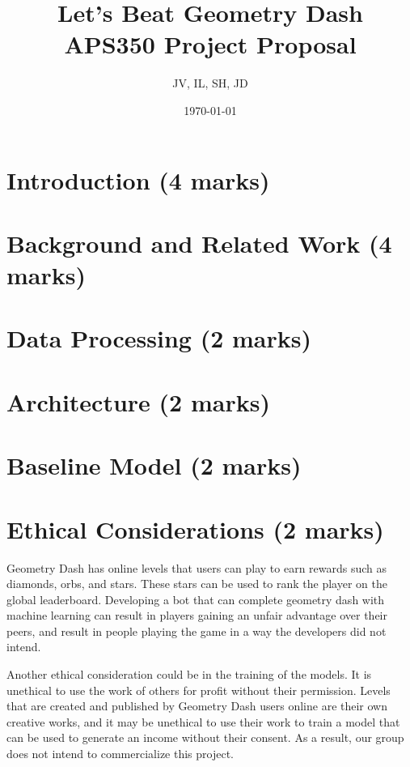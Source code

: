 \documentclass{article}
\title{%
  Let's Beat Geometry Dash \\
  \large APS350 Project Proposal
  }
\author{JV, IL, SH, JD}
\date{\today}
\begin{document}
\maketitle

\pagebreak
\section{Introduction (4 marks)}

\section{Background and Related Work (4 marks)}

\section{Data Processing (2 marks)}

\section{Architecture (2 marks)}

\section{Baseline Model (2 marks)}

\section{Ethical Considerations (2 marks)}
Geometry Dash has online levels that users can play to earn rewards such as 
diamonds, orbs, and stars. These stars can be used to rank the player on the 
global leaderboard. Developing a bot that can complete geometry dash with 
machine learning can result in players gaining an unfair advantage over their 
peers, and result in people playing the game in a way the developers did not 
intend.

Another ethical consideration could be in the training of the models. It is 
unethical to use the work of others for profit without their permission. 
Levels that are created and published by Geometry Dash users online are their 
own creative works, and it may be unethical to use their work to train a 
model that can be used to generate an income without their consent. As a 
result, our group does not intend to commercialize this project.
\end{document}
